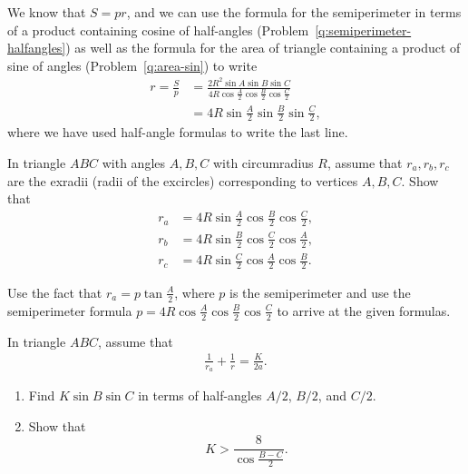 \begin{solution}[name=Calculating the Inradius]
    We know that $S=pr$, and we can use the formula for the semiperimeter in terms of a product containing cosine of half-angles (Problem~\ref{q:semiperimeter-halfangles}) as well as the formula for the area of triangle containing a product of sine of angles (Problem~\ref{q:area-sin}) to write
    \begin{align*}
        r = \frac{S}{p} &= \frac{2R^2 \sin A \sin B \sin C}{4R\cos\frac{A}{2}\cos\frac{B}{2}\cos\frac{C}{2}}\\
        &= 4R\sin\frac{A}{2}\sin\frac{B}{2}\sin\frac{C}{2},
    \end{align*}
    where we have used half-angle formulas to write the last line.
\end{solution}



\begin{tcolorbox}
    \begin{question}[name=Calculating the Exradii]
        In triangle $ABC$ with angles $A,B,C$ with circumradius $R$, assume that $r_a,r_b,r_c$ are the exradii (radii of the excircles) corresponding to vertices $A,B,C$. Show that
        \begin{align*}
            r_a &= 4R\sin\frac{A}{2}\cos\frac{B}{2}\cos\frac{C}{2},\\
            r_b &= 4R\sin\frac{B}{2}\cos\frac{C}{2}\cos\frac{A}{2},\\
            r_c &= 4R\sin\frac{C}{2}\cos\frac{A}{2}\cos\frac{B}{2}.
        \end{align*}
    \end{question}
\end{tcolorbox}

\begin{solution}[name=Calculating the Exradii]
    Use the fact that $r_a = p \tan \frac{A}{2}$, where $p$ is the semiperimeter and use the semiperimeter formula $p=4R\cos\frac{A}{2}\cos\frac{B}{2}\cos\frac{C}{2}$ to arrive at the given formulas.
\end{solution}


\begin{question}
    In triangle $ABC$, assume that
    \begin{align*}
        \frac{1}{r_a} + \frac{1}{r} = \frac{K}{2a}.
    \end{align*}
    \begin{enumerate}
        \item Find $K\sin B \sin C$ in terms of half-angles $A/2$, $B/2$, and $C/2$.
        \item Show that $$K > \displaystyle\frac{8}{\displaystyle\cos \frac{B-C}{2}}.$$
    \end{enumerate}
\end{question}

